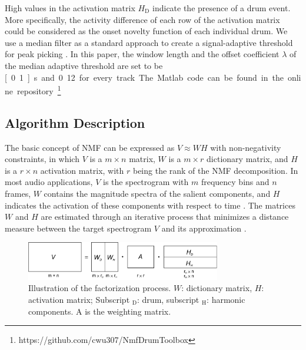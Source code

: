 \documentclass{article}
\begin{document}
High values in the activation matrix $H_\mathrm{D}$ indicate the presence of a drum event. More specifically, the activity difference of each row of the activation matrix could be considered as the onset novelty function of each individual drum. We use a median filter as a standard approach to create a signal-adaptive threshold for peak picking \cite{Lerch2012}. In this paper, the window length and the offset coefficient $\lambda$ of the median adaptive threshold are set to be \unit[0.1]{s} and 0.12 for every track. The Matlab code can be found in the online repository.\footnote{https://github.com/cwu307/NmfDrumToolbox}

\subsection{Algorithm Description}\label{subsec:algorithm}
The basic concept of NMF can be expressed as $V \approx WH$ with non-negativity constraints, in which $V$ is a $m \times n$ matrix, $W$ is a $m \times r$ dictionary matrix, and $H$ is a $r \times n$ activation matrix, with $r$ being the rank of the NMF decomposition. In most audio applications, $V$ is the spectrogram with $m$ frequency bins and $n$ frames, $W$ contains the magnitude spectra of the salient components, and $H$ indicates the activation of these components with respect to time \cite{smaragdis_non-negative_2003}. The matrices $W$ and $H$ are estimated through an iterative process that minimizes a distance measure between the target spectrogram $V$ and its approximation \cite{lee_algorithms_2000}. 

\begin{figure}
 \centering 
  \centerline{
 \includegraphics[width=8.5cm]{factorization.pdf}}
 \caption{Illustration of the factorization process. $W$: dictionary matrix, $H$: activation matrix; Subscript $_\mathrm{D}$: drum, subscript $_\mathrm{H}$: harmonic components. $\mathrm{A}$ is the weighting matrix. }
 \label{fig:factorization}
\end{figure}
\end{document}
